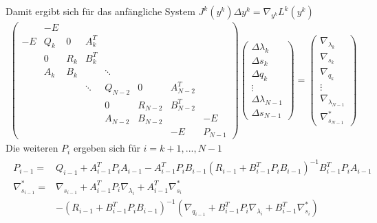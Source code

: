 \documentclass[12pt,a4paper]{article}
\begin{document}
  Damit ergibt sich für das anfängliche System $ J^{k}(y^{k})\Delta y^{k} = \nabla_{y^{k}} L^{k}(y^{k})$
  \begin{align*}
  \begin{pmatrix}
    & -E &   &   &   &   &   &      \\
  -E& Q_k & 0  &  A_k^{T} &  &   &    &       \\
    & 0   & R_k & B_k^{T} &  &   &   &      \\
    & A_k & B_k &     & \ddots &   &   &    \\
    &  &  & \ddots & Q_{N-2} & 0 & A_{N-2}^{T}  &     \\
    &  &  &        &  0      & R_{N-2}  & B_{N-2}^{T}  &     \\
    &  &  &        & A_{N-2} & B_{N-2}  &     & -E \\
    &  &  &  &  &  & -E & P_{N-1}
  \end{pmatrix}
  \begin{pmatrix}
  \Delta \lambda_{k} \\
  \Delta s_{k} \\
  \Delta q_{k} \\
  \vdots \\
  \Delta \lambda_{N-1} \\
  \Delta s_{N-1} 
  \end{pmatrix} =
  \begin{pmatrix}
  \nabla_{\lambda_{k}} \\
  \nabla_{s_{k}} \\ 
  \nabla_{q_{k}} \\
  \vdots \\
  \nabla_{\lambda_{N-1}} \\
  \nabla_{s_{N-1}}^{*}
  \end{pmatrix}
  \end{align*}
  Die weiteren $P_i $ ergeben sich für $ i = k+1, ..., N-1$
  \begin{align*}
  \begin{array}{rl}
  P_{i-1} = & Q_{i-1}+A_{i-1}^{T}P_i A_{i-1} -A_{i-1}^{T}P_i B_{i-1}
  (R_{i-1}+B_{i-1}^{T}P_i B_{i-1})^{-1} B_{i-1}^{T}P_i A_{i-1} \\
  \nabla_{s_{i-1}}^{*} = & \nabla_{s_{i-1}} + A_{i-1}^{T}P_i \nabla_{\lambda_{i}} + A_{i-1}^{T}\nabla_{s_{i}}^{*} \\
   & - (R_{i-1}+B_{i-1}^{T}P_i B_{i-1})^{-1}(\nabla_{q_{i-1}} +B_{i-1}^{T}P_i \nabla_{\lambda_{i}} +B_{i-1}^{T}\nabla_{s_{i}}^{*})
  \end{array}
  \end{align*}
\end{document}
